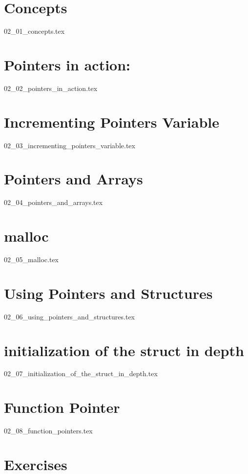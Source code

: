 \section{Concepts}
{02_01_concepts.tex}

\section{Pointers in action:}
{02_02_pointers_in_action.tex}

\section{Incrementing Pointers Variable}
{02_03_incrementing_pointers_variable.tex}

\section{Pointers and Arrays}
{02_04_pointers_and_arrays.tex}

\section{malloc}
{02_05_malloc.tex}

\section{Using Pointers and Structures}
{02_06_using_pointers_and_structures.tex}

\section{initialization of the struct in depth}
{02_07_initialization_of_the_struct_in_depth.tex}

\section{Function Pointer}
{02_08_function_pointers.tex}

\section{Exercises}